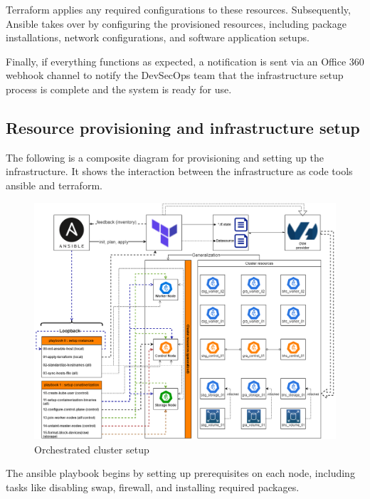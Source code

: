 \hspace{7mm}Terraform applies any required configurations to these resources. Subsequently, Ansible takes over by configuring the provisioned resources, including package installations, network configurations, and software application setups.

\hspace{7mm}Finally, if everything functions as expected, a notification is sent via an Office 360 webhook channel to notify the DevSecOps team that the infrastructure setup process is complete and the system is ready for use.

\subsection{Resource provisioning and infrastructure setup}

\hspace{7mm}The following is a composite diagram for provisioning and setting up the infrastructure. It shows the interaction between the infrastructure as code tools ansible and terraform. 

\begin{figure}[H]\centering
\includegraphics[width=1.0\textwidth,angle=00]{assets/f19.png}
\caption{Orchestrated cluster setup}
\label{fig:Orchestrated cluster setup}
\end{figure}

\hspace{7mm}The ansible playbook begins by setting up prerequisites on each node, including tasks like disabling swap, firewall, and installing required packages.

